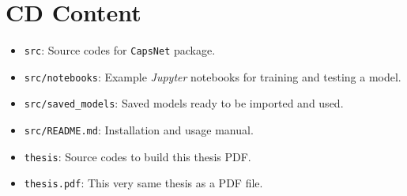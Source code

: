 \chapter{CD Content}

\begin{itemize}
    \item \texttt{src}: Source codes for \texttt{CapsNet} package.
    \item \texttt{src/notebooks}: Example \textit{Jupyter} notebooks for training and testing a model.
    \item \texttt{src/saved\_models}: Saved models ready to be imported and used.
    \item \texttt{src/README.md}: Installation and usage manual.
    \item \texttt{thesis}: Source codes to build this thesis PDF.
    \item \texttt{thesis.pdf}: This very same thesis as a PDF file.
\end{itemize}
